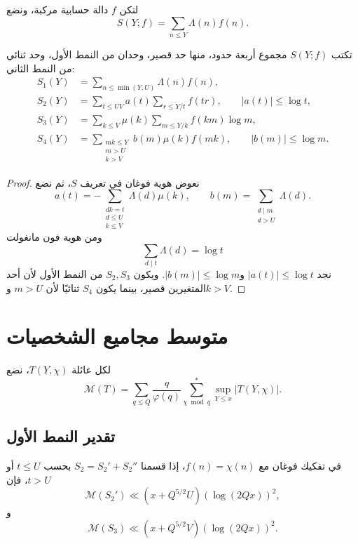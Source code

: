 لتكن \(f\) دالة حسابية مركبة، ونضع
\[
S(Y;f)=\sum_{n\le Y}\Lambda(n)f(n).
\]

\begin{proposition}
\label{prop:chapter13-type-decomposition}
\provedhere
تكتب \(S(Y;f)\) مجموع أربعة حدود، منها حد قصير، وحدان من النمط الأول، وحد
ثنائي من النمط الثاني:
\begin{align*}
S_1(Y)
&=\sum_{n\le\min(Y,U)}\Lambda(n)f(n),\\
S_2(Y)
&=\sum_{t\le UV}a(t)
\sum_{r\le Y/t}f(tr),
\qquad |a(t)|\le\log t,\\
S_3(Y)
&=\sum_{k\le V}\mu(k)
\sum_{m\le Y/k}f(km)\log m,\\
S_4(Y)
&=\sum_{\substack{mk\le Y\\m>U\\k>V}}
 b(m)\mu(k)f(mk),
\qquad |b(m)|\le\log m.
\end{align*}
\end{proposition}

\begin{proof}
نعوض هوية فوغان في تعريف \(S\)، ثم نضع
\[
a(t)=-\sum_{\substack{dk=t\\d\le U\\k\le V}}
\Lambda(d)\mu(k),
\qquad
b(m)=\sum_{\substack{d\mid m\\d>U}}\Lambda(d).
\]
ومن هوية فون مانغولت
\[
\sum_{d\mid t}\Lambda(d)=\log t
\]
نجد \(|a(t)|\le\log t\) و\(|b(m)|\le\log m\). ويكون \(S_2,S_3\) من
النمط الأول لأن أحد المتغيرين قصير، بينما يكون \(S_4\) ثنائيًا لأن
\(m>U\) و\(k>V\).
\end{proof}

\section{متوسط مجاميع الشخصيات}

لكل عائلة \(T(Y,\chi)\)، نضع
\[
\mathcal M(T)
=
\sum_{q\le Q}\frac{q}{\varphi(q)}
\sum_{\chi\bmod q}^{*}
\sup_{Y\le x}|T(Y,\chi)|.
\]

\subsection{تقدير النمط الأول}

\begin{lemma}
\label{lem:chapter13-type-one}
\provedhere
في تفكيك فوغان مع \(f(n)=\chi(n)\)، إذا قسمنا \(S_2=S_2'+S_2''\)
بحسب \(t\le U\) أو \(t>U\)، فإن
\[
\mathcal M(S_2')
\ll
\left(x+Q^{5/2}U\right)(\log(2Qx))^2,
\tag{13.5}
\]
و
\[
\mathcal M(S_3)
\ll
\left(x+Q^{5/2}V\right)(\log(2Qx))^2.
\tag{13.6}
\]
\end{lemma}

